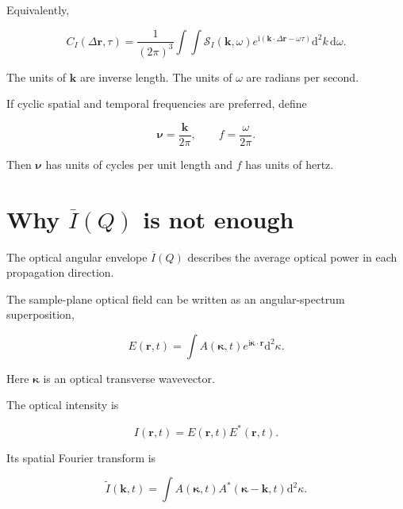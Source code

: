\documentclass[11pt]{article}
\renewcommand{\dd}{\mathrm{d}}
\newcommand{\ii}{\mathrm{i}}
\newcommand{\SII}{\mathcal{S}_{I}}
\newcommand{\kvec}{\mathbf{k}}
\newcommand{\rvec}{\mathbf{r}}
\begin{document}
Equivalently,

\begin{equation}
    C_I(\Delta\rvec,\tau)
    =
    \frac{1}{(2\pi)^3}
    \int
    \int
    \SII(\kvec,\omega)
    e^{\ii(\kvec\cdot\Delta\rvec-\omega\tau)}
    \dd^2k\,\dd\omega.
\end{equation}

The units of $\kvec$ are inverse length. The units of $\omega$ are radians per
second.

If cyclic spatial and temporal frequencies are preferred, define

\begin{equation}
    \bm{\nu}=\frac{\kvec}{2\pi},
    \qquad
    f=\frac{\omega}{2\pi}.
\end{equation}

Then $\bm{\nu}$ has units of cycles per unit length and $f$ has units of hertz.

\section{Why \texorpdfstring{$\overline{I}(Q)$}{I(Q)} is not enough}

The optical angular envelope $\overline{I}(Q)$ describes the average optical
power in each propagation direction.

The sample-plane optical field can be written as an angular-spectrum
superposition,

\begin{equation}
    E(\rvec,t)
    =
    \int
    A(\bm{\kappa},t)
    e^{\ii\bm{\kappa}\cdot\rvec}
    \dd^2\kappa.
\end{equation}

Here $\bm{\kappa}$ is an optical transverse wavevector.

The optical intensity is

\begin{equation}
    I(\rvec,t)
    =
    E(\rvec,t)E^*(\rvec,t).
\end{equation}

Its spatial Fourier transform is

\begin{equation}
\boxed{
    \widetilde{I}(\kvec,t)
    =
    \int
    A(\bm{\kappa},t)
    A^*(\bm{\kappa}-\kvec,t)
    \dd^2\kappa.
}
\label{eq:intensity_convolution}
\end{equation}
\end{document}
